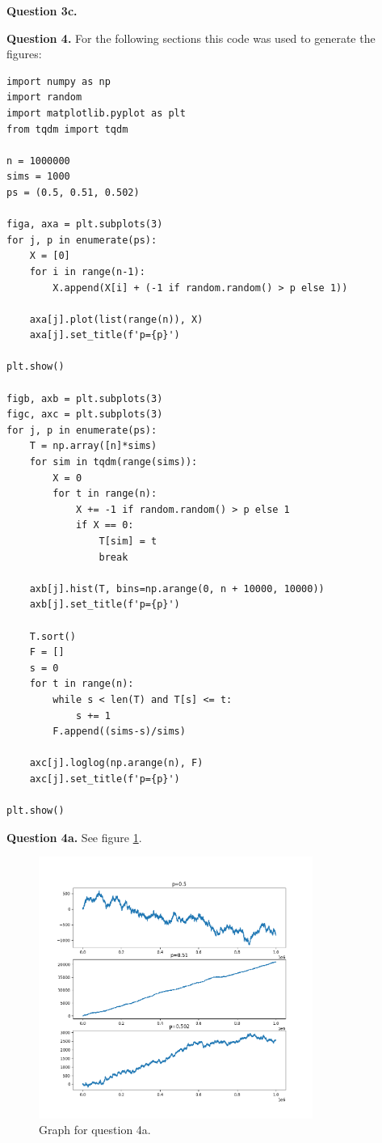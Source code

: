 \documentclass[letterpaper, reqno,11pt]{article}
\begin{document}
{\medskip\noindent\bf Question 3c.} 

{\medskip\noindent\bf Question 4.} For the following sections this code was used to generate the figures:

\begin{lstlisting}
import numpy as np
import random
import matplotlib.pyplot as plt
from tqdm import tqdm

n = 1000000
sims = 1000
ps = (0.5, 0.51, 0.502)

figa, axa = plt.subplots(3)
for j, p in enumerate(ps):
    X = [0]
    for i in range(n-1):
        X.append(X[i] + (-1 if random.random() > p else 1))
        
    axa[j].plot(list(range(n)), X)
    axa[j].set_title(f'p={p}')

plt.show()

figb, axb = plt.subplots(3)
figc, axc = plt.subplots(3)
for j, p in enumerate(ps):
    T = np.array([n]*sims)
    for sim in tqdm(range(sims)):
        X = 0
        for t in range(n):
            X += -1 if random.random() > p else 1
            if X == 0:
                T[sim] = t
                break

    axb[j].hist(T, bins=np.arange(0, n + 10000, 10000))
    axb[j].set_title(f'p={p}')

    T.sort()
    F = []
    s = 0
    for t in range(n):
        while s < len(T) and T[s] <= t:
            s += 1
        F.append((sims-s)/sims)

    axc[j].loglog(np.arange(n), F)
    axc[j].set_title(f'p={p}')

plt.show()
\end{lstlisting}

{\medskip\noindent\bf Question 4a.} See figure \ref{fig:4a}. 

\begin{figure}[htpb]
    \centering
    \includegraphics[width=0.8\textwidth]{4a}
    \caption{Graph for question 4a.}
    \label{fig:4a}
\end{figure}
\end{document}
